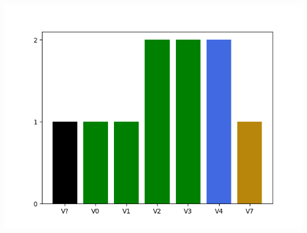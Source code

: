 

















\raggedcolumns
\begin{multicols}{2}
\includegraphics[width=\linewidth]{./maps/plots//Quartzville Creek.png}
\end{multicols}
